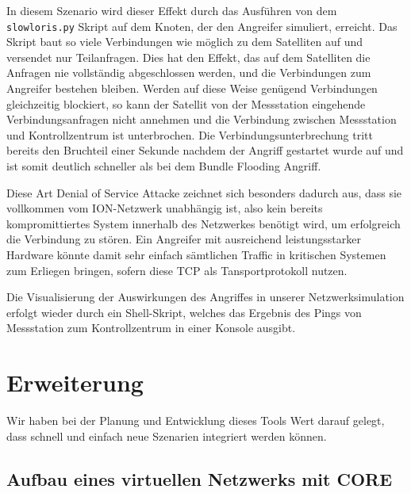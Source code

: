\documentclass{article}
\begin{document}
In diesem Szenario wird dieser Effekt durch das Ausführen von dem \texttt{slowloris.py} Skript auf dem Knoten, der den Angreifer simuliert, erreicht. Das Skript baut so viele Verbindungen wie möglich zu dem Satelliten auf und versendet nur Teilanfragen. Dies hat den Effekt, das auf dem Satelliten die Anfragen nie vollständig abgeschlossen werden, und die Verbindungen zum Angreifer bestehen bleiben. Werden auf diese Weise genügend Verbindungen gleichzeitig blockiert, so kann der Satellit von der  Messstation eingehende Verbindungsanfragen nicht annehmen und die Verbindung zwischen Messstation und Kontrollzentrum ist unterbrochen. Die Verbindungsunterbrechung tritt bereits den Bruchteil einer Sekunde nachdem der Angriff gestartet wurde auf und ist somit deutlich schneller als bei dem Bundle Flooding Angriff.\par
Diese Art Denial of Service Attacke zeichnet sich besonders dadurch aus, dass sie vollkommen vom ION-Netzwerk unabhängig ist, also kein bereits kompromittiertes System innerhalb des Netzwerkes benötigt wird, um erfolgreich die Verbindung zu stören. Ein Angreifer mit ausreichend leistungsstarker Hardware könnte damit sehr einfach sämtlichen Traffic in kritischen Systemen zum Erliegen bringen, sofern diese TCP als Tansportprotokoll nutzen.\par
Die Visualisierung der Auswirkungen des Angriffes in unserer Netzwerksimulation erfolgt wieder durch ein Shell-Skript, welches das Ergebnis des Pings von Messstation zum Kontrollzentrum in einer Konsole ausgibt.
\newpage
\section{Erweiterung}
Wir haben bei der Planung und Entwicklung dieses Tools Wert darauf gelegt, dass schnell und einfach neue Szenarien integriert werden können.
\subsection{Aufbau eines virtuellen Netzwerks mit CORE}
\end{document}
